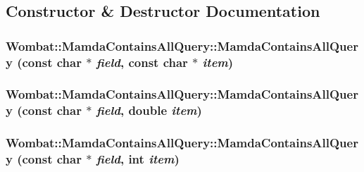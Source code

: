 \subsection{Constructor \& Destructor Documentation}
\hypertarget{classWombat_1_1MamdaContainsAllQuery_845d1b617481ef88d7e8c72ad97bb5ee}{
\subsubsection[MamdaContainsAllQuery]{\setlength{\rightskip}{0pt plus 5cm}Wombat::Mamda\-Contains\-All\-Query::Mamda\-Contains\-All\-Query (const char $\ast$ {\em field}, const char $\ast$ {\em item})}}
\label{classWombat_1_1MamdaContainsAllQuery_845d1b617481ef88d7e8c72ad97bb5ee}


\hypertarget{classWombat_1_1MamdaContainsAllQuery_90dbad50f39f29b1a9fe8a70f403cb55}{
\subsubsection[MamdaContainsAllQuery]{\setlength{\rightskip}{0pt plus 5cm}Wombat::Mamda\-Contains\-All\-Query::Mamda\-Contains\-All\-Query (const char $\ast$ {\em field}, double {\em item})}}
\label{classWombat_1_1MamdaContainsAllQuery_90dbad50f39f29b1a9fe8a70f403cb55}


\hypertarget{classWombat_1_1MamdaContainsAllQuery_541bef824d5bb2f2b02a7095a447d5c2}{
\subsubsection[MamdaContainsAllQuery]{\setlength{\rightskip}{0pt plus 5cm}Wombat::Mamda\-Contains\-All\-Query::Mamda\-Contains\-All\-Query (const char $\ast$ {\em field}, int {\em item})}}
\label{classWombat_1_1MamdaContainsAllQuery_541bef824d5bb2f2b02a7095a447d5c2}





